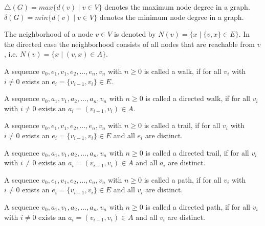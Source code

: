 \begin{definition}
$\triangle (G) = max\{d(v) \mid v \in V \}$ denotes the maximum node degree in a graph. $\delta (G) = min\{d(v) \mid v \in V \}$ denotes the minimum node degree in a graph.
\end{definition}

\begin{definition}
The neighborhood of a node $v \in V$ is denoted by $N(v) = \{x \mid \{v, x\} \in E\}$. In the directed case the neighborhood consists of all nodes that are reachable from $v$, i.e. $N(v) = \{x \mid (v, x) \in A\}$.
\end{definition}

\begin{definition}[Walk]
A sequence $v_0,e_1,v_1,e_2,\ldots ,e_n,v_n$ with $n \geq 0$ is called
a walk, if for all $v_i$ with $i \neq 0$ exists an $e_i = \{v_{i-1} , v_i \} \in E$.
\end{definition}

\begin{definition}
A sequence $v_0,a_1,v_1,a_2,\ldots ,a_n,v_n$ with $n \geq 0$ is called a directed walk, if for all $v_i$ with $i \neq 0$ exists an $a_i = (v_{i-1} , v_i ) \in A$.
\end{definition}

\begin{definition}[Trail]
A sequence $v_0,e_1,v_1,e_2,\dots ,e_n,v_n$ with $n \geq 0$ is called a trail, if for all $v_i$ with $i \neq 0$ exists an $e_i = \{v_{i-1}, v_i\} \in E$ and all $e_i$ are distinct.
\end{definition}

\begin{definition}
A sequence $v_0,a_1,v_1,a_2,\ldots ,a_n,v_n$ with $n \geq 0$ is called a directed trail, if for all $v_i$ with $i \neq 0$ exists an $a_i = (v_{i-1}, v_i) \in A$ and all $a_i$ are distinct.
\end{definition}

\begin{definition}[Path]
A sequence $v_0,e_1,v_1,e_2,\ldots , e_n,v_n$ with $n \geq 0$ is called a path, if for all $v_i$ with $i \neq 0$ exists an $e_i = \{v_{i-1} , v_i\} \in E$ and all $v_i$ are distinct.
\end{definition}

\begin{definition}
A sequence $v_0,a_1,v_1,a_2,\ldots ,a_n,v_n$ with $n \geq 0$ is called a directed path, if for all $v_i$ with $i \neq 0$ exists an $a_i = (v_{i-1}, v_i) \in A$ and all $v_i$ are distinct.
\end{definition}


